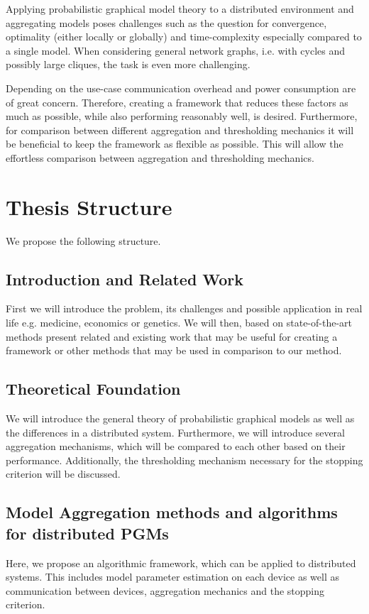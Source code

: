   Applying probabilistic graphical model theory to a distributed environment and aggregating models poses challenges such as the question for convergence, optimality (either locally or globally) and time-complexity especially compared to a single model.
  When considering general network graphs, i.e. with cycles and possibly large cliques, the task is even more challenging.

  Depending on the use-case communication overhead and power consumption are of great concern. 
  Therefore, creating a framework that reduces these factors as much as possible, while also performing reasonably well, is desired.
  Furthermore, for comparison between different aggregation and thresholding mechanics it will be beneficial to keep the framework as flexible as possible.
  This will allow the effortless comparison between aggregation and thresholding mechanics. 

   
  \section{Thesis Structure}
    We propose the following structure.
    
  \subsection{Introduction and Related Work}
    First we will introduce the problem, its challenges and possible application in real life e.g. medicine, economics or genetics. We will then, based on state-of-the-art methods present related and existing work that may be useful for creating a framework or other methods that may be used in comparison to our method.

  \subsection{Theoretical Foundation}
    We will introduce the general theory of probabilistic graphical models as well as the differences in a distributed system. 
    Furthermore, we will introduce several aggregation mechanisms, which will be compared to each other based on their performance.
    Additionally, the thresholding mechanism necessary for the  stopping criterion will be discussed. 

  \subsection{Model Aggregation methods and algorithms for distributed PGMs}
    Here, we propose an algorithmic framework, which can be applied to distributed systems.
    This includes model parameter estimation on each device as well as communication between devices, aggregation mechanics and the stopping criterion.

